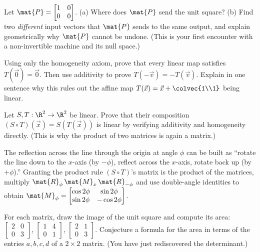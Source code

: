 \begin{exercise}
\label{ch05:ex-collapse}
Let $\mat{P} = \begin{bmatrix} 1 & 0 \\ 0 & 0\end{bmatrix}$. (a) Where does
$\mat{P}$ send the unit square? (b) Find two \emph{different} input vectors that
$\mat{P}$ sends to the same output, and explain geometrically why $\mat{P}$ cannot
be undone. (This is your first encounter with a non-invertible machine and its
null space.)
\end{exercise}

\begin{exercise}
\label{ch05:ex-origin}
Using only the homogeneity axiom, prove that every linear map satisfies
$T(\vec{0}) = \vec{0}$. Then use additivity to prove $T(-\vec{v}) = -T(\vec{v})$.
Explain in one sentence why this rules out the affine map
$T(\vec{x}) = \vec{x} + \colvec{1\\1}$ being linear.
\end{exercise}

\begin{exercise}
\label{ch05:ex-compose-linear}
Let $S, T : \R^2 \to \R^2$ be linear. Prove that their composition $(S \circ
T)(\vec{x}) = S(T(\vec{x}))$ is linear by verifying additivity and homogeneity
directly. (This is why the product of two matrices is again a matrix.)
\end{exercise}

\begin{exercise}
\label{ch05:ex-genreflect}
The reflection across the line through the origin at angle $\phi$ can be built as
``rotate the line down to the $x$-axis (by $-\phi$), reflect across the $x$-axis,
rotate back up (by $+\phi$).'' Granting the product rule
$(S\circ T)$'s matrix is the product of the matrices, multiply
$\mat{R}_{\phi}\,\mat{M}_x\,\mat{R}_{-\phi}$ and use double-angle identities to
obtain $\mat{M}_\phi = \begin{bmatrix} \cos 2\phi & \sin 2\phi \\ \sin 2\phi &
-\cos 2\phi\end{bmatrix}$.
\end{exercise}

\begin{exercise}
\label{ch05:ex-area}
For each matrix, draw the image of the unit square and compute its area:
$\begin{bmatrix} 2 & 0 \\ 0 & 3\end{bmatrix}$,
$\begin{bmatrix} 1 & 4 \\ 0 & 1\end{bmatrix}$,
$\begin{bmatrix} 2 & 1 \\ 0 & 3\end{bmatrix}$.
Conjecture a formula for the area in terms of the entries $a,b,c,d$ of a $2\times
2$ matrix. (You have just rediscovered the determinant.)
\end{exercise}
